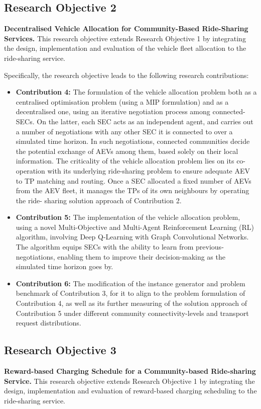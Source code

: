 \subsection{Research Objective 2}
\textbf{Decentralised Vehicle Allocation for Community-Based Ride-Sharing Services.}
This research objective extends Research Objective 1 by integrating the design,
implementation and evaluation of the vehicle fleet allocation to the ride-sharing service.

Specifically, the research objective leads to the following research contributions:
\begin{itemize}
    \item \textbf{Contribution 4:} The formulation of the vehicle allocation problem both as a centralised optimisation problem (using a MIP formulation) and as a decentralised one, using an iterative negotiation process among connected-SECs. On the latter, each SEC acts as an independent agent, and carries out a number of negotiations with any other SEC it is connected to over a simulated time horizon. In such negotiations, connected
    communities decide the potential exchange of AEVs among them, based solely on their local information. The criticality of the vehicle allocation problem lies on its co-
    operation with its underlying ride-sharing problem to ensure adequate AEV to TP
    matching and routing. Once a SEC allocated a fixed number of AEVs from the AEV
    fleet, it manages the TPs of its own neighbours by operating the ride-
    sharing solution approach of Contribution 2.

    \item \textbf{Contribution 5:} The implementation of the vehicle allocation problem, using a novel Multi-Objective and Multi-Agent Reinforcement Learning (RL) algorithm, involving Deep Q-Learning with Graph Convolutional Networks. The algorithm equips SECs with the ability to learn from previous-negotiations, enabling them to improve their decision-making as the simulated time horizon goes by.

    \item \textbf{Contribution 6:} The modification of the instance generator and problem benchmark of Contribution 3, for it to align to the problem formulation of Contribution 4, as well as its further measuring of the solution approach of Contribution 5 under different community connectivity-levels and transport request distributions.    
\end{itemize}

\subsection{Research Objective 3}
\textbf{Reward-based Charging Schedule for a Community-based Ride-sharing Service.}
This research objective extends Research Objective 1 by integrating the design,
implementation and evaluation of reward-based charging scheduling to the ride-sharing
service.

